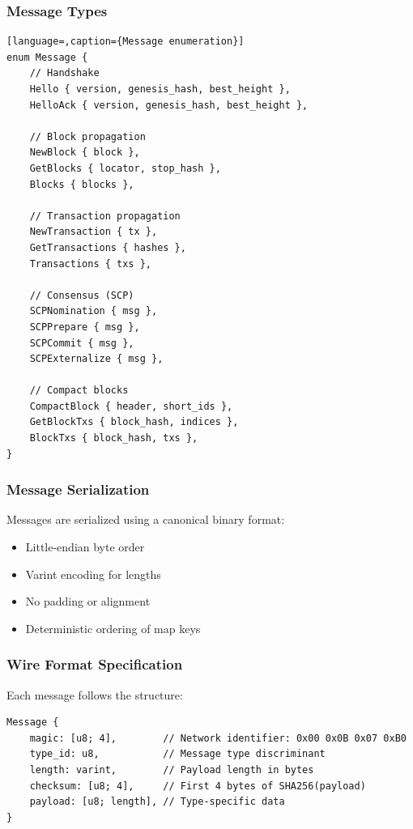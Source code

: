 \subsubsection{Message Types}

\begin{lstlisting}[language=,caption={Message enumeration}]
enum Message {
    // Handshake
    Hello { version, genesis_hash, best_height },
    HelloAck { version, genesis_hash, best_height },

    // Block propagation
    NewBlock { block },
    GetBlocks { locator, stop_hash },
    Blocks { blocks },

    // Transaction propagation
    NewTransaction { tx },
    GetTransactions { hashes },
    Transactions { txs },

    // Consensus (SCP)
    SCPNomination { msg },
    SCPPrepare { msg },
    SCPCommit { msg },
    SCPExternalize { msg },

    // Compact blocks
    CompactBlock { header, short_ids },
    GetBlockTxs { block_hash, indices },
    BlockTxs { block_hash, txs },
}
\end{lstlisting}

\subsubsection{Message Serialization}

Messages are serialized using a canonical binary format:
\begin{itemize}
  \item Little-endian byte order
  \item Varint encoding for lengths
  \item No padding or alignment
  \item Deterministic ordering of map keys
\end{itemize}

\subsubsection{Wire Format Specification}

Each message follows the structure:

\begin{lstlisting}[caption={Message wire format}]
Message {
    magic: [u8; 4],        // Network identifier: 0x00 0x0B 0x07 0xB0
    type_id: u8,           // Message type discriminant
    length: varint,        // Payload length in bytes
    checksum: [u8; 4],     // First 4 bytes of SHA256(payload)
    payload: [u8; length], // Type-specific data
}
\end{lstlisting}

